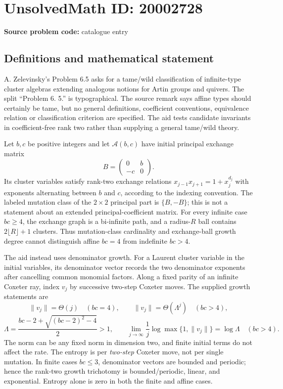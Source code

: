 \documentclass[11pt]{article}
\begin{document}
\section*{UnsolvedMath ID: 20002728}
\textbf{Source problem code:} catalogue entry
\subsection{Definitions and mathematical statement}
A. Zelevinsky's Problem 6.5 asks for a tame/wild classification of infinite-type cluster algebras extending analogous notions for Artin groups and quivers. The split ``Problem 6. 5.'' is typographical. The source remark says affine types should certainly be tame, but no general definitions, coefficient conventions, equivalence relation or classification criterion are specified. The aid tests candidate invariants in coefficient-free rank two rather than supplying a general tame/wild theory.

Let $b,c$ be positive integers and let $\mathcal A(b,c)$ have initial principal exchange matrix
\[
B=\begin{pmatrix}0&b\\-c&0\end{pmatrix}.
\]
Its cluster variables satisfy rank-two exchange relations $x_{j-1}x_{j+1}=1+x_j^{d_j}$ with exponents alternating between $b$ and $c$, according to the indexing convention. The labeled mutation class of the $2\times2$ principal part is $\{B,-B\}$; this is not a statement about an extended principal-coefficient matrix. For every infinite case $bc\geq4$, the exchange graph is a bi-infinite path, and a radius-$R$ ball contains $2\lfloor R\rfloor+1$ clusters. Thus mutation-class cardinality and exchange-ball growth degree cannot distinguish affine $bc=4$ from indefinite $bc>4$.

The aid instead uses denominator growth. For a Laurent cluster variable in the initial variables, its denominator vector records the two denominator exponents after cancelling common monomial factors. Along a fixed parity of an infinite Coxeter ray, index $v_j$ by successive two-step Coxeter moves. The supplied growth statements are
\[
\|v_j\|=\Theta(j)\quad(bc=4),\qquad
\|v_j\|=\Theta(\Lambda^j)\quad(bc>4),
\]
\[
\Lambda=\frac{bc-2+\sqrt{(bc-2)^2-4}}2>1,
\qquad
\lim_{j\to\infty}\frac1j\log\max\{1,\|v_j\|\}=\log\Lambda\quad(bc>4).
\]
The norm can be any fixed norm in dimension two, and finite initial terms do not affect the rate. The entropy is per \emph{two-step} Coxeter move, not per single mutation. In finite cases $bc\leq3$, denominator vectors are bounded and periodic; hence the rank-two growth trichotomy is bounded/periodic, linear, and exponential. Entropy alone is zero in both the finite and affine cases.
\end{document}
